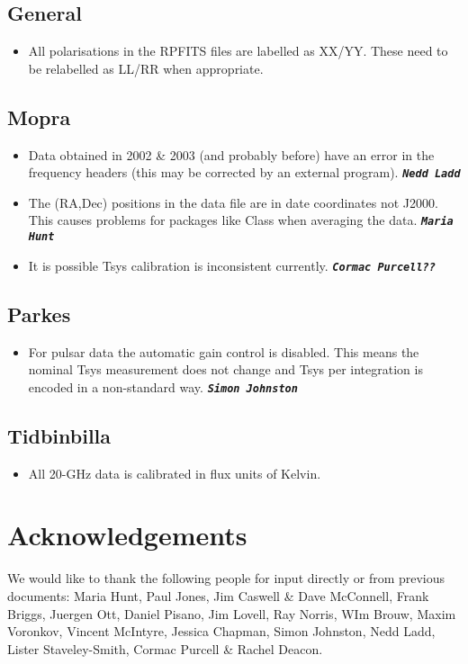 \documentclass[11pt]{article}
\newcounter{requirement}
\newcommand{\makenote}[1]{{\bf \tt \em#1}}
\let\oldsection\section
\renewcommand{\section}[1]{\setcounter{requirement}{0}\oldsection{#1}}
\let\oldsubsection\subsection
\renewcommand{\subsection}[1]{\setcounter{requirement}{0}\oldsubsection{#1}}
\begin{document}
\subsection{General}

\begin{itemize}
  \item All polarisations in the RPFITS files are labelled as
  XX/YY. These need to be relabelled as LL/RR when appropriate.
\end{itemize}

\subsection{Mopra}

\begin{itemize}
\item Data obtained in 2002 \& 2003 (and probably before) have an
  error in the frequency headers (this may be corrected by an external
  program). \makenote{Nedd Ladd}

\item The (RA,Dec) positions in the data file are in date coordinates
  not J2000. This causes problems for packages like Class when
  averaging the data. \makenote{Maria Hunt}

\item It is possible Tsys calibration is inconsistent currently.
  \makenote{Cormac Purcell??}

\end{itemize}

\subsection{Parkes}

\begin{itemize}
\item For pulsar data the automatic gain control is disabled. This
means the nominal Tsys measurement does not change and Tsys per
integration is encoded in a non-standard way. \makenote{Simon
Johnston}
\end{itemize}

\subsection{Tidbinbilla}

\begin{itemize}
\item All 20-GHz data is calibrated in flux units of Kelvin.
\end{itemize}

\section{Acknowledgements}

We would like to thank the following people for input directly or from
previous documents: Maria Hunt, Paul Jones, Jim Caswell \& Dave
McConnell, Frank Briggs, Juergen Ott, Daniel Pisano, Jim Lovell, Ray
Norris, WIm Brouw, Maxim Voronkov, Vincent McIntyre, Jessica Chapman,
Simon Johnston, Nedd Ladd, Lister Staveley-Smith, Cormac Purcell \&
Rachel Deacon.
\end{document}
